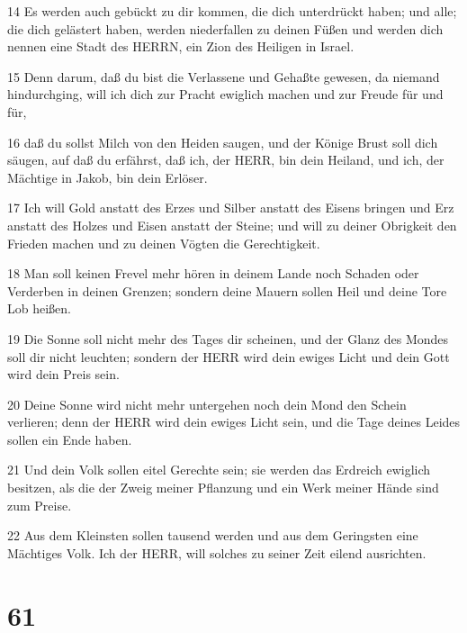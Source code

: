 \par 14 Es werden auch gebückt zu dir kommen, die dich unterdrückt haben; und alle; die dich gelästert haben, werden niederfallen zu deinen Füßen und werden dich nennen eine Stadt des HERRN, ein Zion des Heiligen in Israel.
\par 15 Denn darum, daß du bist die Verlassene und Gehaßte gewesen, da niemand hindurchging, will ich dich zur Pracht ewiglich machen und zur Freude für und für,
\par 16 daß du sollst Milch von den Heiden saugen, und der Könige Brust soll dich säugen, auf daß du erfährst, daß ich, der HERR, bin dein Heiland, und ich, der Mächtige in Jakob, bin dein Erlöser.
\par 17 Ich will Gold anstatt des Erzes und Silber anstatt des Eisens bringen und Erz anstatt des Holzes und Eisen anstatt der Steine; und will zu deiner Obrigkeit den Frieden machen und zu deinen Vögten die Gerechtigkeit.
\par 18 Man soll keinen Frevel mehr hören in deinem Lande noch Schaden oder Verderben in deinen Grenzen; sondern deine Mauern sollen Heil und deine Tore Lob heißen.
\par 19 Die Sonne soll nicht mehr des Tages dir scheinen, und der Glanz des Mondes soll dir nicht leuchten; sondern der HERR wird dein ewiges Licht und dein Gott wird dein Preis sein.
\par 20 Deine Sonne wird nicht mehr untergehen noch dein Mond den Schein verlieren; denn der HERR wird dein ewiges Licht sein, und die Tage deines Leides sollen ein Ende haben.
\par 21 Und dein Volk sollen eitel Gerechte sein; sie werden das Erdreich ewiglich besitzen, als die der Zweig meiner Pflanzung und ein Werk meiner Hände sind zum Preise.
\par 22 Aus dem Kleinsten sollen tausend werden und aus dem Geringsten eine Mächtiges Volk. Ich der HERR, will solches zu seiner Zeit eilend ausrichten.

\chapter{61}

